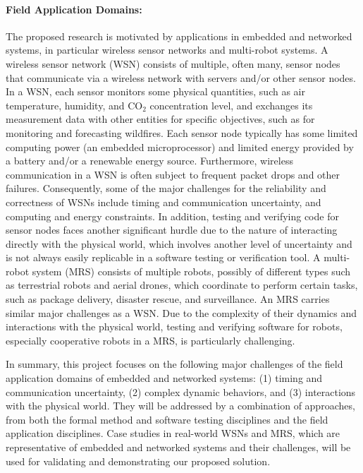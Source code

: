\paragraph{Field Application Domains:}
\label{sec:field-applications}   The proposed research is motivated by applications in embedded and networked systems, in particular wireless sensor networks and multi-robot systems.
  A wireless sensor network (WSN) consists of multiple, often many, sensor nodes that communicate via a wireless network with servers and/or other sensor nodes.
  In a WSN, each sensor monitors some physical quantities, such as air temperature, humidity, and CO$_{2}$ concentration level, and exchanges its measurement data with other entities %
  for specific objectives, such as for monitoring and forecasting wildfires.
  Each sensor node typically has some limited computing power (an embedded microprocessor) and limited energy provided by a battery and/or a renewable energy source.
  Furthermore, wireless communication in a WSN is often subject to frequent %
  packet drops and other failures.
  Consequently, some of the major challenges for the reliability and correctness of WSNs include timing and communication uncertainty, and computing and energy constraints.
  In addition, testing and verifying  code for sensor nodes faces another significant hurdle due to the nature of interacting directly with the physical world, which involves another level of uncertainty and is not always easily replicable in a software testing or verification tool.
  A multi-robot system (MRS) consists of multiple robots, possibly of different types such as terrestrial robots and aerial drones, which coordinate to perform certain tasks, such as package delivery, disaster rescue, and surveillance.
  An MRS carries similar major challenges as a WSN.
  Due to the complexity of their dynamics and interactions with the physical world, testing and verifying software for robots, especially cooperative robots in a MRS, is particularly challenging.

  In summary, this project focuses on the following major challenges of the field application domains of embedded and networked systems:
  (1) timing and communication uncertainty,
  (2) complex dynamic behaviors, and
  (3) interactions with the physical world.
  They will be addressed by a combination of approaches, from both the formal method and software testing disciplines and the field application disciplines.
  Case studies in real-world WSNs and MRS, which are representative of embedded and networked systems and their challenges, will be used for validating and demonstrating our proposed solution.

